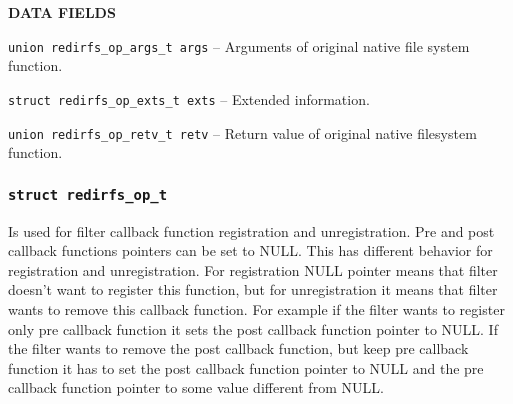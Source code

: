 \begin{list}{}{}
	\item \textbf{DATA FIELDS}
		\begin{list}{}{}
			\item \texttt{union redirfs\_op\_args\_t args} -- Arguments of
				original native file system function.
			\item \texttt{struct redirfs\_op\_exts\_t exts} -- Extended
				information.
			\item \texttt{union redirfs\_op\_retv\_t retv} -- Return value
				of original native filesystem function.
		\end{list}
\end{list}

\subsubsection{\texttt{struct redirfs\_op\_t}}
Is used for filter callback function registration and unregistration. Pre and post
callback functions pointers can be set to NULL. This has different behavior for
registration and unregistration. For registration NULL pointer means that filter
doesn't want to register this function, but for unregistration it means that filter
wants to remove this callback function. For example if the filter wants to register only
pre callback function it sets the post callback function pointer to NULL. If the
filter wants to remove the post callback function, but keep pre callback function it
has to set the post callback function pointer to NULL and the pre callback
function pointer to some value different from NULL. 

